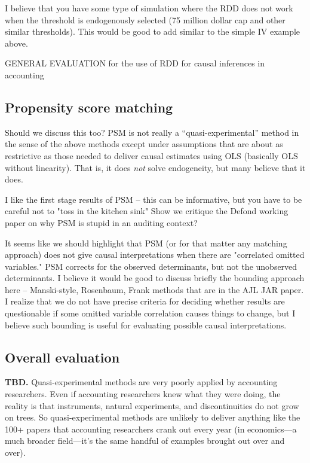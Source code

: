 \documentclass[11pt]{amsart}
\begin{document}
I believe that you have some type of simulation where the RDD does not work when the threshold is endogenously selected (75 million dollar cap and other similar thresholds).  This would be good to add similar to the simple IV example above.

GENERAL EVALUATION for the use of RDD for causal inferences in accounting 


\subsection{Propensity score matching}

Should we discuss this too? PSM is not really a ``quasi-experimental'' method in the sense of the above methods except under assumptions that are about as restrictive as those needed to deliver causal estimates using OLS (basically OLS without linearity). That is, it does \emph{not} solve endogeneity, but many believe that it does.

I like the first stage results of PSM -- this can be informative, but you have to be careful not to "toss in the kitchen sink"  Show we critique the Defond working paper on why PSM is stupid in an auditing context?

It seems like we should highlight that PSM (or for that matter any matching approach) does not give causal interpretations when there are "correlated omitted variables."  PSM corrects for the observed determinants, but not the unobserved determinants.  I believe it would be good to discuss briefly the bounding approach here -- Manski-style, Rosenbaum, Frank methods that are in the AJL JAR paper.  I realize that we do not have precise criteria for deciding whether results are questionable if some omitted variable correlation causes things to change, but I believe such bounding is useful for evaluating possible causal interpretations.



\subsection{Overall evaluation} 
\textbf{TBD.} Quasi-experimental methods are very poorly applied by accounting researchers. Even if accounting researchers knew what they were doing, the reality is that instruments, natural experiments, and discontinuities do not grow on trees. So quasi-experimental methods are unlikely to deliver anything like the 100+ papers that accounting researchers crank out every year (in economics---a much broader field---it's the same handful of examples brought out over and over).
\end{document}
